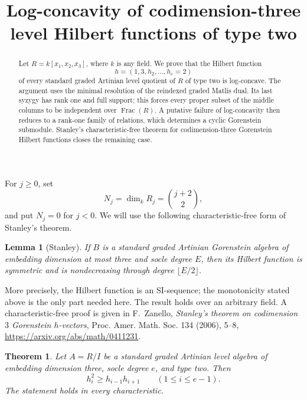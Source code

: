 \documentclass[11pt]{article}
\title{Log-concavity of codimension-three level Hilbert functions of type two}
\author{}
\date{}
\newtheorem{theorem}{Theorem}
\newtheorem{lemma}{Lemma}
\begin{document}
\maketitle

\begin{abstract}
Let $R=k[x_1,x_2,x_3]$, where $k$ is any field.  We prove that the
Hilbert function
\[
  h=(1,3,h_2,\ldots,h_e=2)
\]
of every standard graded Artinian level quotient of $R$ of type two is
log-concave.  The argument uses the minimal resolution of the reindexed
graded Matlis dual.  Its last syzygy has rank one and full support; this
forces every proper subset of the middle columns to be independent over
$\operatorname{Frac}(R)$.  A putative failure of log-concavity then
reduces to a rank-one family of relations, which determines a cyclic
Gorenstein submodule.  Stanley's characteristic-free theorem for
codimension-three Gorenstein Hilbert functions closes the remaining case.
\end{abstract}

For $j\geq0$, set
\[
  N_j=\dim_k R_j=\binom{j+2}{2},
\]
and put $N_j=0$ for $j<0$.  We will use the following
characteristic-free form of Stanley's theorem.

\begin{lemma}[Stanley]
\label{lem:stanley}
If $B$ is a standard graded Artinian Gorenstein algebra of embedding
dimension at most three and socle degree $E$, then its Hilbert function
is symmetric and is nondecreasing through degree $\lfloor E/2\rfloor$.
\end{lemma}

More precisely, the Hilbert function is an SI-sequence; the
monotonicity stated above is the only part needed here.  The result
holds over an arbitrary field.  A characteristic-free proof is given
in F.~Zanello,
\emph{Stanley's theorem on codimension $3$ Gorenstein $h$-vectors},
Proc. Amer. Math. Soc. 134 (2006), 5--8,
\url{https://arxiv.org/abs/math/0411231}.

\begin{theorem}
Let $A=R/I$ be a standard graded Artinian level algebra of embedding
dimension three, socle degree $e$, and type two.  Then
\[
  h_i^2\geq h_{i-1}h_{i+1}
  \qquad(1\leq i\leq e-1).
\]
The statement holds in every characteristic.
\end{theorem}
\end{document}
